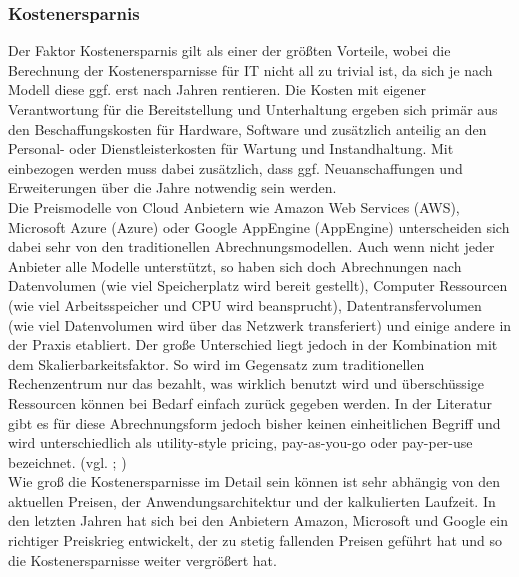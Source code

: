\subsubsection{Kostenersparnis}\label{kostenersparnis}
Der Faktor Kostenersparnis gilt als einer der größten Vorteile, wobei die Berechnung der Kostenersparnisse für IT nicht all zu trivial ist, da sich je nach Modell diese ggf. erst nach Jahren rentieren. Die Kosten mit eigener Verantwortung für die Bereitstellung und Unterhaltung ergeben sich primär aus den Beschaffungskosten für Hardware, Software und zusätzlich anteilig an den Personal- oder Dienstleisterkosten für Wartung und Instandhaltung. Mit einbezogen werden muss dabei zusätzlich, dass ggf. Neuanschaffungen und Erweiterungen über die Jahre notwendig sein werden.\\
 Die Preismodelle von Cloud Anbietern wie Amazon Web Services (AWS), Microsoft Azure (Azure) oder Google AppEngine (AppEngine) unterscheiden sich dabei sehr von den traditionellen Abrechnungsmodellen. Auch wenn nicht jeder Anbieter alle Modelle unterstützt, so haben sich doch Abrechnungen nach Datenvolumen (wie viel Speicherplatz wird bereit gestellt), Computer Ressourcen (wie viel Arbeitsspeicher und CPU wird beansprucht), Datentransfervolumen (wie viel Datenvolumen wird über das Netzwerk transferiert) und einige andere in der Praxis etabliert. Der große Unterschied liegt jedoch in der Kombination mit dem Skalierbarkeitsfaktor. So wird im Gegensatz zum traditionellen Rechenzentrum nur das bezahlt, was wirklich benutzt wird und überschüssige Ressourcen können bei Bedarf einfach zurück gegeben werden. In der Literatur gibt es für diese Abrechnungsform jedoch bisher keinen einheitlichen Begriff und wird unterschiedlich als utility-style pricing, pay-as-you-go oder pay-per-use bezeichnet. (vgl. \citeauthor*[S. 879]{Jadeja.2012}; \citeauthor*[S. 313]{Achimugu.2012}) \\
 Wie groß die Kostenersparnisse im Detail sein können ist sehr abhängig von den aktuellen Preisen, der Anwendungsarchitektur und der kalkulierten Laufzeit. In den letzten Jahren hat sich bei den Anbietern Amazon, Microsoft und Google ein richtiger Preiskrieg entwickelt, der zu stetig fallenden Preisen geführt hat und so die Kostenersparnisse weiter vergrößert hat. 

